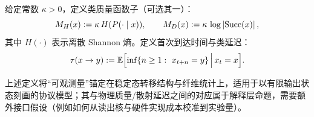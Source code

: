 \begin{definition}[类质量与类延迟（模型）]\label{def:class-mass-delay}
给定常数 $\kappa>0$，定义类质量函数子（可选其一）：
\[
M_H(x):=\kappa\, H(P(\cdot\mid x)),\qquad
M_D(x):=\kappa\,\log\left\lvert \mathrm{Succ}(x)\right\rvert,
\]
其中 $H(\cdot)$ 表示离散 Shannon 熵。定义首次到达时间与类延迟：
\[
\tau(x\to y):=\mathbb{E}\Bigl[\inf\{n\ge 1:\ x_{t+n}=y\}\,\Big|\,x_t=x\Bigr].
\]
\end{definition}

\begin{remark}
上述定义将“可观测量”锚定在稳定态转移结构与纤维统计上，适用于以有限输出状态刻画的协议模型；其与物理质量/散射延迟之间的对应属于解释层命题，需要额外接口假设（例如如何从读出核与硬件实现成本校准到实验量）。
\end{remark}

